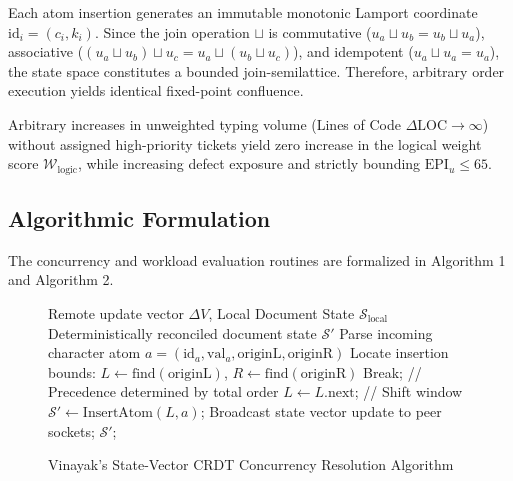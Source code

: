 \documentclass[conference]{IEEEtran}
\begin{document}
\begin{IEEEproof}
Each atom insertion generates an immutable monotonic Lamport coordinate $\text{id}_i = (c_i, k_i)$. Since the join operation $\sqcup$ is commutative ($u_a \sqcup u_b = u_b \sqcup u_a$), associative ($(u_a \sqcup u_b) \sqcup u_c = u_a \sqcup (u_b \sqcup u_c)$), and idempotent ($u_a \sqcup u_a = u_a$), the state space constitutes a bounded join-semilattice. Therefore, arbitrary order execution yields identical fixed-point confluence.
\end{IEEEproof}

\begin{theorem}
Arbitrary increases in unweighted typing volume (Lines of Code $\Delta \text{LOC} \to \infty$) without assigned high-priority tickets yield zero increase in the logical weight score $\mathcal{W}_{\text{logic}}$, while increasing defect exposure and strictly bounding $\text{EPI}_u \le 65$.
\end{theorem}

\subsection{Algorithmic Formulation}
The concurrency and workload evaluation routines are formalized in Algorithm 1 and Algorithm 2.

\begin{figure}[!ht]
\begin{algorithmic}[1]
\REQUIRE Remote update vector $\Delta V$, Local Document State $\mathcal{S}_{\text{local}}$
\ENSURE Deterministically reconciled document state $\mathcal{S}'$
\STATE Parse incoming character atom $a = (\text{id}_a, \text{val}_a, \text{originL}, \text{originR})$
\STATE Locate insertion bounds: $L \leftarrow \text{find}(\text{originL})$, $R \leftarrow \text{find}(\text{originR})$
        \STATE Break; // Precedence determined by total order
    \ELSE
        \STATE $L \leftarrow L.\text{next}$; // Shift window
    \ENDIF
\ENDWHILE
\STATE $\mathcal{S}' \leftarrow \text{InsertAtom}(L, a)$;
\STATE Broadcast state vector update to peer sockets;
\RETURN $\mathcal{S}'$;
\end{algorithmic}
\caption{Vinayak's State-Vector CRDT Concurrency Resolution Algorithm}
\end{figure}
\end{document}
